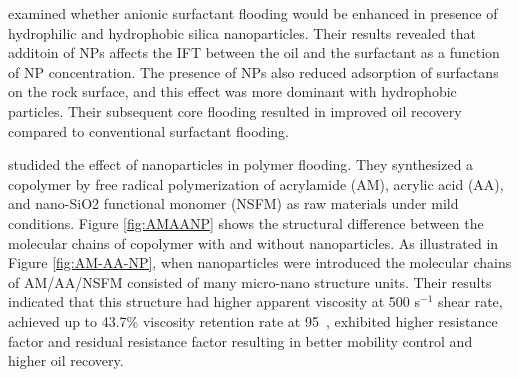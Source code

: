 \citet{Zargartalebi2015} examined whether anionic surfactant flooding would be enhanced in presence of hydrophilic and hydrophobic silica nanoparticles. Their results revealed that additoin of NPs affects the IFT between the oil and the surfactant as a function of NP concentration. The presence of NPs also reduced adsorption of surfactans on the rock surface, and this effect was more dominant with hydrophobic particles. Their subsequent core flooding resulted in improved oil recovery compared to conventional surfactant flooding.

\citet{Ye2013} studided the effect of nanoparticles in polymer flooding. They synthesized a copolymer by free radical polymerization of acrylamide (AM), acrylic acid (AA), and nano-SiO2 functional monomer (NSFM) as raw materials under mild conditions. Figure \ref{fig:AMAANP} shows the structural difference between the molecular chains of copolymer with and without nanoparticles. As illustrated in Figure \ref{fig:AM-AA-NP}, when nanoparticles were introduced the molecular chains of AM/AA/NSFM consisted of many micro-nano structure units. Their results indicated that this structure had higher apparent viscosity at 500 s$^{-1}$ shear rate, achieved up to 43.7\% viscosity retention rate at 95~\celsius, exhibited higher resistance factor and residual resistance factor resulting in better mobility control and higher oil recovery.
